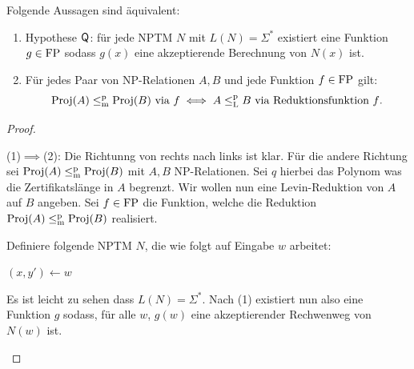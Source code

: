 \begin{theorem}\label{thm:q-as-levin}
    Folgende Aussagen sind äquivalent:
    \begin{enumerate}
        \item Hypothese $\mathsf{Q}$: für jede NPTM $N$ mit $L(N)=\Sigma^*$ existiert eine Funktion $g\in\mathrm{FP}$ sodass $g(x)$ eine akzeptierende Berechnung von $N(x)$ ist. 
        \item Für jedes Paar von NP-Relationen $A, B$ und jede Funktion $f\in\mathrm{FP}$ gilt:
            \[ \operatorname{Proj}(A) \leq_\mathrm{m}^\mathrm{p} \operatorname{Proj}(B) \text{ via $f$} \iff A \leq_\mathrm{L}^\mathrm{p} B \text{ via Reduktionsfunktion $f$}. \]
    \end{enumerate}
\end{theorem}
\begin{proof}
    \begin{prooflist}[label={}]
\item (1)$\implies$(2): Die Richtunng von rechts nach links ist klar. Für die andere Richtung sei $\operatorname{Proj}(A) \leq_\mathrm{m}^\mathrm{p} \operatorname{Proj}(B)$ mit $A,B$ NP-Relationen. Sei $q$ hierbei das Polynom was die Zertifikatslänge in $A$ begrenzt.
    Wir wollen nun eine Levin-Reduktion von $A$ auf $B$ angeben. Sei $f\in \mathrm{FP}$ die Funktion, welche die Reduktion $\operatorname{Proj}(A) \leq_\mathrm{m}^\mathrm{p} \operatorname{Proj}(B)$ realisiert.

    Definiere folgende NPTM $N$, die wie folgt auf Eingabe $w$ arbeitet: \\
    \begin{algorithm}[H]
        $(x, y')\gets w$\;
    \end{algorithm}
    Es ist leicht zu sehen dass $L(N)=\Sigma^*$. Nach (1) existiert nun also eine Funktion $g$ sodass, für alle $w$, $g(w)$ eine akzeptierender Rechwenweg von $N(w)$ ist.


\end{prooflist}
\end{proof}

